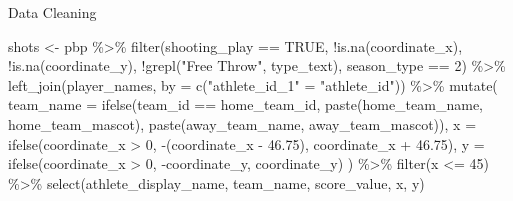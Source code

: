 \documentclass[
  9pt,
  ignorenonframetext,
  aspectratio=169]{beamer}
\newenvironment{Shaded}{\begin{snugshade}}{\end{snugshade}}
\newcommand{\AttributeTok}[1]{\textcolor[rgb]{0.00,0.34,0.68}{#1}}
\newcommand{\ConstantTok}[1]{\textcolor[rgb]{0.67,0.33,0.00}{#1}}
\newcommand{\DecValTok}[1]{\textcolor[rgb]{0.69,0.50,0.00}{#1}}
\newcommand{\FloatTok}[1]{\textcolor[rgb]{0.69,0.50,0.00}{#1}}
\newcommand{\FunctionTok}[1]{\textcolor[rgb]{0.39,0.29,0.61}{#1}}
\newcommand{\NormalTok}[1]{\textcolor[rgb]{0.12,0.11,0.11}{#1}}
\newcommand{\OtherTok}[1]{\textcolor[rgb]{0.00,0.43,0.16}{#1}}
\newcommand{\SpecialCharTok}[1]{\textcolor[rgb]{0.24,0.68,0.91}{#1}}
\newcommand{\StringTok}[1]{\textcolor[rgb]{0.75,0.01,0.01}{#1}}
\begin{document}
\begin{frame}[fragile]{Data Cleaning}
\label{data-cleaning}
\begin{Shaded}
\begin{Highlighting}[]
\NormalTok{shots }\OtherTok{\textless{}{-}}\NormalTok{ pbp }\SpecialCharTok{\%\textgreater{}\%}
  \FunctionTok{filter}\NormalTok{(shooting\_play }\SpecialCharTok{==} \ConstantTok{TRUE}\NormalTok{,}
         \SpecialCharTok{!}\FunctionTok{is.na}\NormalTok{(coordinate\_x),}
         \SpecialCharTok{!}\FunctionTok{is.na}\NormalTok{(coordinate\_y),}
         \SpecialCharTok{!}\FunctionTok{grepl}\NormalTok{(}\StringTok{"Free Throw"}\NormalTok{, type\_text),}
\NormalTok{         season\_type }\SpecialCharTok{==} \DecValTok{2}\NormalTok{) }\SpecialCharTok{\%\textgreater{}\%}
  \FunctionTok{left\_join}\NormalTok{(player\_names, }\AttributeTok{by =} \FunctionTok{c}\NormalTok{(}\StringTok{"athlete\_id\_1"} \OtherTok{=} \StringTok{"athlete\_id"}\NormalTok{)) }\SpecialCharTok{\%\textgreater{}\%}
  \FunctionTok{mutate}\NormalTok{(}
    \AttributeTok{team\_name =} \FunctionTok{ifelse}\NormalTok{(team\_id }\SpecialCharTok{==}\NormalTok{ home\_team\_id,}
                       \FunctionTok{paste}\NormalTok{(home\_team\_name, home\_team\_mascot),}
                       \FunctionTok{paste}\NormalTok{(away\_team\_name, away\_team\_mascot)),}
    \AttributeTok{x =} \FunctionTok{ifelse}\NormalTok{(coordinate\_x }\SpecialCharTok{\textgreater{}} \DecValTok{0}\NormalTok{, }\SpecialCharTok{{-}}\NormalTok{(coordinate\_x }\SpecialCharTok{{-}} \FloatTok{46.75}\NormalTok{), coordinate\_x }\SpecialCharTok{+} \FloatTok{46.75}\NormalTok{),}
    \AttributeTok{y =} \FunctionTok{ifelse}\NormalTok{(coordinate\_x }\SpecialCharTok{\textgreater{}} \DecValTok{0}\NormalTok{, }\SpecialCharTok{{-}}\NormalTok{coordinate\_y, coordinate\_y)}
\NormalTok{  ) }\SpecialCharTok{\%\textgreater{}\%}
  \FunctionTok{filter}\NormalTok{(x }\SpecialCharTok{\textless{}=} \DecValTok{45}\NormalTok{) }\SpecialCharTok{\%\textgreater{}\%}
  \FunctionTok{select}\NormalTok{(athlete\_display\_name, team\_name, score\_value, x, y)}
\end{Highlighting}
\end{Shaded}
\end{frame}
\end{document}
